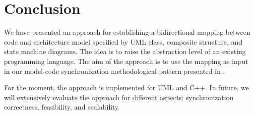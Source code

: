 \section{Conclusion}
\label{sec:conclusion}
We have presented an approach for establishing a bidirectional mapping between code and architecture model specified by UML class, composite structure, and state machine diagrams.
The idea is to raise the abstraction level of an existing programming language.
The aim of the approach is to use the mapping as input in our model-code synchronization methodological pattern presented in \cite{foster2016}.

  

For the moment, the approach is implemented for UML and C++.
In future, we will extensively evaluate the approach for different aspects: synchronization correctness, feasibility, and scalability. 
 


